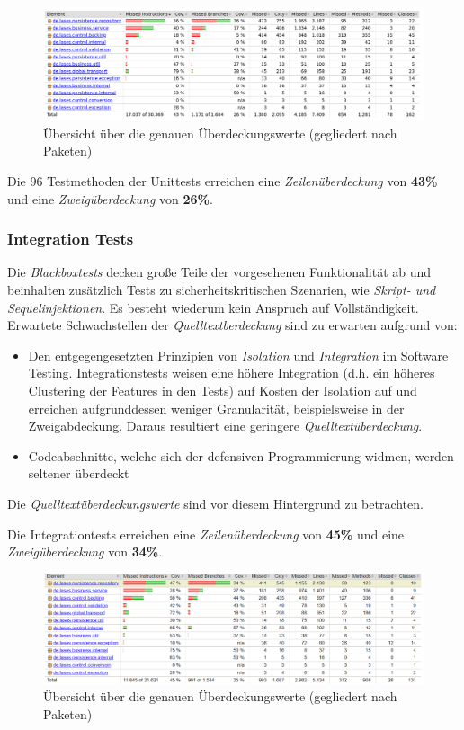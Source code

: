 \begin{figure}[h]
    \centering
    \includegraphics[width=0.9\linewidth]{graphics/coverage_unit}
    \caption{Übersicht über die genauen Überdeckungswerte (gegliedert nach Paketen)}
    \label{fig:coverage_unit}
\end{figure}

Die 96 Testmethoden der Unittests erreichen eine \emph{Zeilenüberdeckung} von \textbf{43\%}
und eine \emph{Zweigüberdeckung} von \textbf{26\%}.


\subsubsection{Integration Tests}
Die \emph{Blackboxtests} decken große Teile der vorgesehenen Funktionalität ab und beinhalten zusätzlich Tests
zu sicherheitskritischen Szenarien, wie \emph{Skript- und Sequelinjektionen}.
Es besteht wiederum kein Anspruch auf Vollständigkeit.
Erwartete Schwachstellen der \emph{Quelltextberdeckung} sind zu erwarten aufgrund von:
\begin{itemize}
    \item Den entgegengesetzten Prinzipien von \emph{Isolation} und \emph{Integration} im Software Testing.
    Integrationstests weisen eine höhere Integration (d.h. ein höheres Clustering der Features in den Tests)
    auf Kosten der Isolation auf und erreichen aufgrunddessen weniger Granularität, beispielsweise in der Zweigabdeckung.
    Daraus resultiert eine geringere \emph{Quelltextüberdeckung}.
    \item Codeabschnitte, welche sich der defensiven Programmierung widmen, werden seltener überdeckt
\end{itemize}
Die \emph{Quelltextüberdeckungswerte} sind vor diesem Hintergrund zu betrachten.

Die Integrationtests erreichen eine \emph{Zeilenüberdeckung} von \textbf{45\%}
und eine \emph{Zweigüberdeckung} von \textbf{34\%}.

\begin{figure}[h]
    \centering
    \includegraphics[width=0.9\linewidth]{graphics/coverage_it}
    \caption{Übersicht über die genauen Überdeckungswerte (gegliedert nach Paketen)}
    \label{fig:coverag_it}
\end{figure}